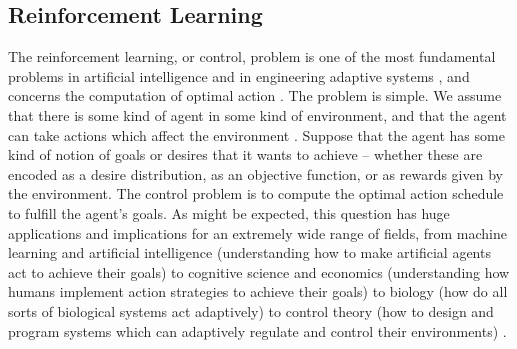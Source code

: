\subsection{Reinforcement Learning}

The reinforcement learning, or control, problem is one of the most fundamental problems in artificial intelligence and in engineering adaptive systems \citep{sutton1990integrated,sutton1998introduction,kaelbling1996reinforcement,dayan1997using}, and concerns the computation of optimal action \citep{wolpert1997computational,todorov2008general}. The problem is simple. We assume that there is some kind of agent in some kind of environment, and that the agent can take actions which affect the environment \citep{sutton1998introduction}.  Suppose that the agent has some kind of notion of goals or desires that it wants to achieve -- whether these are encoded as a desire distribution, as an objective function, or as rewards given by the environment. The control problem is to compute the optimal action schedule to fulfill the agent's goals. As might be expected, this question has huge applications and implications for an extremely wide range of fields, from machine learning and artificial intelligence (understanding how to make artificial agents act to achieve their goals) \citep{sutton1998introduction,mnih2013playing,silver2016mastering,schrittwieser2019mastering,schulman2015trust} to cognitive science and economics (understanding how humans implement action strategies to achieve their goals) \citep{todorov2008general,wolpert1997computational,dayan2008decision,daw2006cortical} to biology (how do all sorts of biological systems act adaptively) \citep{dayan2009goal,mehlhorn2015unpacking,krebs1978test,pyke1984optimal} to control theory (how to design and program systems which can adaptively regulate and control their environments) \citep{kirk2004optimal,kwakernaak1972linear,sethi2000optimal,kalman1960contributions,johnson2005pid,kappen2005path}.

